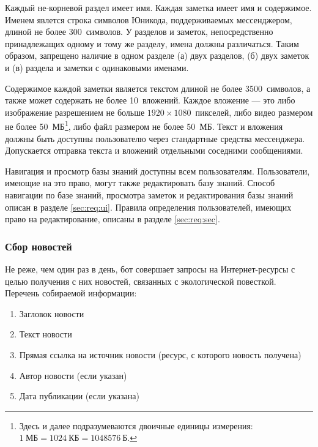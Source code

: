 \documentclass[12pt]{article}
\begin{document}
            Каждый не-корневой раздел имеет имя. Каждая заметка имеет имя и содержимое.
            Именем явлется строка символов Юникода, поддерживаемых мессенджером, длиной
            не более 300~символов. У разделов и заметок, непосредственно принадлежащих одному и тому же
            разделу, имена должны различаться. Таким образом, запрещено наличие в одном разделе
            (а) двух разделов, (б) двух заметок и (в) раздела и заметки с одинаковыми именами.

            Содержимое каждой заметки является текстом длиной не более 3500~символов, а также может содержать
            не более 10~вложений. Каждое вложение --- это либо изображение разрешением не больше
            \(1920 \times 1080\)~пикселей, либо видео размером не более 50~МБ\footnote{
                Здесь и далее подразумеваются двоичные единицы измерения: \(1~\text{МБ} = 1024~\text{КБ}
                = 1048576~\text{Б}\).
            }, либо файл размером не более 50~МБ. Текст и вложения должны быть доступны пользователю
            через стандартные средства мессенджера. Допускается отправка текста и вложений
            отдельными соседними сообщениями.

            Навигация и просмотр базы знаний доступны всем пользователям.
            Пользователи, имеющие на это право, могут также редактировать базу знаний.
            Способ навигации по базе знаний, просмотра заметок и редактирования базы знаний
            описан в разделе \ref{sec:req:ui}.
            Правила определения пользователей, имеющих право на редактирование, описаны в разделе
            \ref{sec:req:sec}.

        \subsubsection{Сбор новостей}
            \label{sec:req:fn:grabnews}
            Не реже, чем один раз в день, бот совершает запросы на Интернет-ресурсы с целью получения с них
            новостей, связанных с экологической повесткой. Перечень собираемой информации:
            \begin{enumerate}
                \item
                    Загловок новости
                \item
                    Текст новости
                \item
                    Прямая ссылка на источник новости (ресурс, с которого новость получена)
                \item
                    Автор новости (если указан)
                \item
                    Дата публикации (если указана)
            \end{enumerate}
\end{document}
